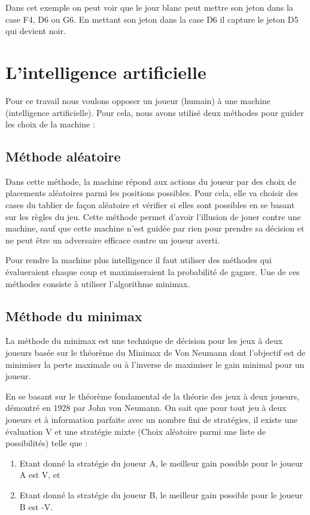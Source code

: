 \documentclass[11pt]{article}
\newcommand{\tmtextit}[1]{{\itshape{#1}}}
\newenvironment{enumeratealpha}{\begin{enumerate}[a{\textup{)}}] }{\end{enumerate}}
\begin{document}
Dans cet exemple on peut voir que le jour blanc peut mettre son jeton dans la
case F4, D6 ou G6. En mettant son jeton dans la case D6 il capture le jeton D5
qui devient noir.

\section{L'intelligence artificielle}

Pour ce travail nous voulons opposer un joueur (humain) à une machine
(intelligence artificielle). Pour cela, nous avons utilisé deux
méthodes pour guider les choix de la machine :

\subsection{Méthode aléatoire}

Dans cette méthode, la machine répond aux actions du joueur par des
choix de placements aléatoires parmi les positions possibles. Pour cela,
elle va choisir des cases du tablier de fa{\c c}on aléatoire et
vérifier si elles sont possibles en se basant sur les règles du jeu.
Cette méthode permet d'avoir l'illusion de jouer contre une machine, sauf
que cette machine n'est guidée par rien pour prendre sa décision et ne
peut être un adversaire efficace contre un joueur averti.

Pour rendre la machine plus intelligence il faut utiliser des méthodes
qui évalueraient chaque coup et maximiseraient la probabilité de
gagner. Une de ces méthodes consiste à utiliser l'algorithme minimax.

\subsection{Méthode du minimax}

La méthode du minimax est une technique de décision pour les jeux
à deux joueurs basée sur le théorème du Minimax de Von Neumann
dont l'objectif est de minimiser la perte maximale ou à l'inverse de
maximiser le gain minimal pour un joueur.

En se basant sur le théorème fondamental de la théorie des jeux
à deux joueurs, démontré en 1928 par John von Neumann. On sait que
pour tout jeu à deux joueurs et à information parfaite avec un nombre
fini de stratégies, il existe une évaluation V et une stratégie
mixte (Choix aléatoire parmi une liste de possibilités) telle que :

\tmtextit{\begin{enumeratealpha}
  \item Etant donné la stratégie du joueur A, le meilleur gain
  possible pour le joueur A est V, et
  
  \item Etant donné la stratégie du joueur B, le\tmtextit{} meilleur
  gain possible pour le joueur B est -V.
\end{enumeratealpha}}
\end{document}

